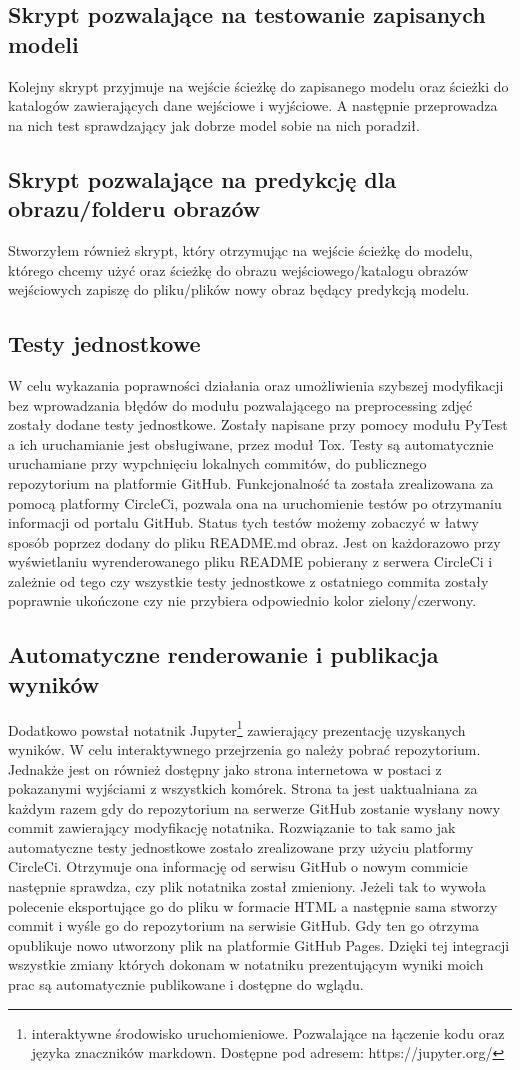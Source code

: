 \documentclass{article}
\begin{document}
\subsection{Skrypt pozwalające na testowanie zapisanych modeli}
Kolejny skrypt przyjmuje na wejście ścieżkę do zapisanego modelu oraz ścieżki do katalogów zawierających dane wejściowe i wyjściowe.
A następnie przeprowadza na nich test sprawdzający jak dobrze model sobie na nich poradził.
\subsection{Skrypt pozwalające na predykcję dla obrazu/folderu obrazów}
Stworzyłem również skrypt, który otrzymując na wejście ścieżkę do modelu, którego chcemy użyć oraz
ścieżkę do obrazu wejściowego/katalogu obrazów wejściowych zapiszę do pliku/plików nowy obraz będący predykcją modelu.
\subsection{Testy jednostkowe}
W celu wykazania poprawności działania oraz umożliwienia szybszej modyfikacji bez wprowadzania błędów do modułu pozwalającego na preprocessing zdjęć
zostały dodane testy jednostkowe. Zostały napisane przy pomocy modułu PyTest a ich uruchamianie jest obsługiwane, przez moduł Tox.
Testy są automatycznie uruchamiane przy wypchnięciu lokalnych commitów, do publicznego repozytorium na platformie GitHub.
Funkcjonalność ta została zrealizowana za pomocą platformy CircleCi, pozwala ona na uruchomienie testów po otrzymaniu informacji od portalu GitHub.
Status tych testów możemy zobaczyć w łatwy sposób poprzez dodany do pliku README.md obraz.
Jest on każdorazowo przy wyświetlaniu wyrenderowanego pliku README pobierany z serwera CircleCi i zależnie od tego czy wszystkie testy jednostkowe z ostatniego commita zostały poprawnie ukończone czy nie przybiera odpowiednio kolor zielony/czerwony.
\subsection{Automatyczne renderowanie i publikacja wyników}
Dodatkowo powstał notatnik Jupyter\footnote{interaktywne środowisko uruchomieniowe. Pozwalające na łączenie kodu oraz języka znaczników markdown. Dostępne pod adresem: https://jupyter.org/} zawierający prezentację uzyskanych wyników.
W celu interaktywnego przejrzenia go należy pobrać repozytorium.
Jednakże jest on również dostępny jako strona internetowa w postaci z pokazanymi wyjściami z wszystkich komórek.
Strona ta jest uaktualniana za każdym razem gdy do repozytorium na serwerze GitHub zostanie wysłany nowy commit zawierający modyfikację notatnika.
Rozwiązanie to tak samo jak automatyczne testy jednostkowe zostało zrealizowane przy użyciu platformy CircleCi.
Otrzymuje ona informację od serwisu GitHub o nowym commicie następnie sprawdza, czy plik notatnika został zmieniony.
Jeżeli tak to wywoła polecenie eksportujące go do pliku w formacie HTML a następnie sama stworzy commit i wyśle go do repozytorium na serwisie GitHub.
Gdy ten go otrzyma opublikuje nowo utworzony plik na platformie GitHub Pages.
Dzięki tej integracji wszystkie zmiany których dokonam w notatniku prezentującym wyniki moich prac są automatycznie publikowane i dostępne do wglądu.
\end{document}
